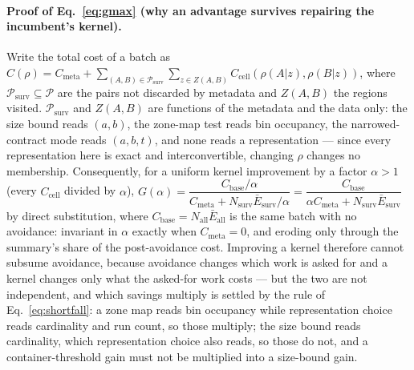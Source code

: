 \paragraph*{Proof of Eq.~\eqref{eq:gmax} (why an advantage survives repairing the incumbent's kernel).}
Write the total cost of a batch as $C(\rho)=C_{\mathrm{meta}}+\sum_{(A,B)\in\mathcal P_{\mathrm{surv}}}
\sum_{z\in Z(A,B)}C_{\mathrm{cell}}(\rho(A|z),\rho(B|z))$, where $\mathcal P_{\mathrm{surv}}\subseteq
\mathcal P$ are the pairs not discarded by metadata and $Z(A,B)$ the regions visited.
$\mathcal P_{\mathrm{surv}}$ and $Z(A,B)$ are functions of the metadata and the data only: the size
bound reads $(a,b)$, the zone-map test reads bin occupancy, the narrowed-contract mode reads $(a,b,t)$,
and none reads a representation --- since every representation here is exact and interconvertible,
changing $\rho$ changes no membership. Consequently, for a uniform kernel improvement by a factor
$\alpha>1$ (every $C_{\mathrm{cell}}$ divided by $\alpha$),
$G(\alpha)=\dfrac{C_{\mathrm{base}}/\alpha}{C_{\mathrm{meta}}+N_{\mathrm{surv}}\bar E_{\mathrm{surv}}/\alpha}
=\dfrac{C_{\mathrm{base}}}{\alpha C_{\mathrm{meta}}+N_{\mathrm{surv}}\bar E_{\mathrm{surv}}}$ by direct
substitution, where $C_{\mathrm{base}}=N_{\mathrm{all}}\bar E_{\mathrm{all}}$ is the same batch with no
avoidance: invariant in $\alpha$ exactly when $C_{\mathrm{meta}}=0$, and eroding only through the
summary's share of the post-avoidance cost. Improving a kernel therefore cannot subsume avoidance,
because avoidance changes which work is asked for and a kernel changes only what the asked-for work
costs --- but the two are not independent, and which savings multiply is settled by the rule of
Eq.~\eqref{eq:shortfall}: a zone map reads bin occupancy while representation choice reads cardinality
and run count, so those multiply; the size bound reads cardinality, which representation choice also
reads, so those do not, and a container-threshold gain must not be multiplied into a size-bound gain.

